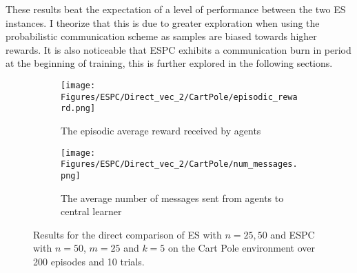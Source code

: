These results beat the expectation of a level of performance between the two ES instances. I theorize that this is due to greater exploration when using the probabilistic communication scheme as samples are biased towards higher rewards. It is also noticeable that ESPC exhibits a communication burn in period at the beginning of training, this is further explored in the following sections.
\begin{figure}[H]
    \centering
    \begin{subfigure}{0.6\textwidth}
        \centering
        \texttt{[image: Figures/ESPC/Direct\_vec\_2/CartPole/episodic\_reward.png]}
        \caption{The episodic average reward received by agents}
        \label{fig:CPEpisodicReward}
    \end{subfigure}
    \begin{subfigure}{0.6\textwidth}
        \centering
        \texttt{[image: Figures/ESPC/Direct\_vec\_2/CartPole/num\_messages.png]}
        \caption{The average number of messages sent from agents to central learner}
        \label{fig:CPMessages}
    \end{subfigure}
    \caption{Results for the direct comparison of ES with $n=25,50$ and ESPC with $n=50$, $m=25$ and $k=5$ on the Cart Pole environment over 200 episodes and 10 trials.}
    \label{fig:DirectCP}
\end{figure}

